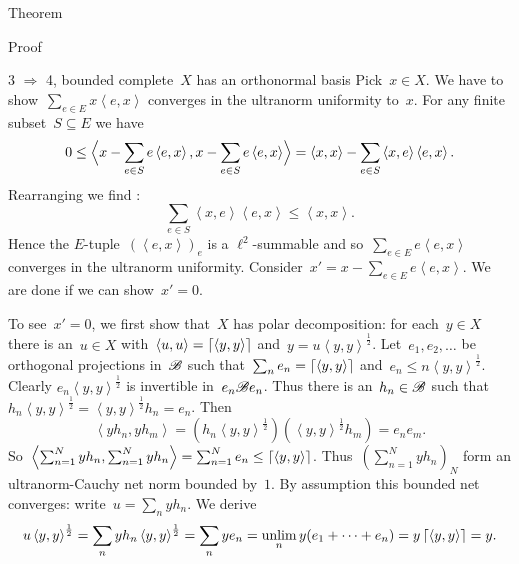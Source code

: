 \documentclass[b]{subfiles}
\begin{document}
\begin{parsec}
\begin{point}{Theorem}
\begin{point}{Proof}
\begin{point}{3
    $\Rightarrow$ 4, bounded complete~$X$ has an orthonormal basis}
Pick~$x \in X$.
We have to show~$\sum_{e \in E} x\left<e,x\right>$
converges in the ultranorm uniformity to~$x$.
For any finite subset~$S \subseteq E$ we have
\begin{equation*}
    0 \leq \Bigl< x - \sum_{e \in S} e\left<e,x\right>,
        x - \sum_{e \in S} e\left<e,x\right> \Bigr>
        = \left<x,x\right> - \sum_{e \in S} \left<x,e\right>\left<e,x\right>.
\end{equation*}
Rearranging we find :
\begin{equation*}
\sum_{e \in S} \left<x,e\right>\left<e,x\right>
    \leq \left<x,x\right>.
\end{equation*}
Hence the $E$-tuple~$(\left<e,x\right>)_e$
is a $\ell^2$-summable
and so~$\sum_{e \in E} e \left<e,x\right>$
converges in the ultranorm uniformity.
Consider~$x' = x - \sum_{e \in E} e\left<e,x\right>$.
We are done if we can show~$x' = 0$.

To see~$x'=0$, we
first show that~$X$ has polar decomposition:
    for each~$y \in X$ there is an~$u\in X$
    with~$\left<u,u\right> = \left\lceil\left<y,y\right>\right\rceil$
        and~$y=u\left<y,y\right>^{\frac{1}{2}}$.
Let~$e_1, e_2, \ldots$ be orthogonal projections in~$\mathscr{B}$ 
    such that~$\sum_n e_n = \left\lceil\left<y,y\right>\right\rceil$
    and~$e_n \leq n\left<y,y\right>^{\frac{1}{2}}$.
    Clearly $e_n \left<y,y\right>^{\frac{1}{2}}$ is invertible
        in~$e_n \mathscr{B} e_n$.
    Thus there is an~$h_n \in \mathscr{B}$
        such that $h_n \left<y,y\right>^{\frac{1}{2}} =
             \left<y,y\right>^{\frac{1}{2}} h_n = e_n$.
Then
\begin{equation*}
    \left<yh_n,yh_m\right> =
        (h_n \left<y,y\right>^{\frac{1}{2}})
        (\left<y,y\right>^{\frac{1}{2}} h_m) = e_ne_m.
\end{equation*}
So~$\left< \sum_{n=1}^N y h_n, \sum_{n=1}^N y h_n \right> 
        = \sum_{n=1}^N e_n \leq \left\lceil\left<y,y\right>\right\rceil$.
Thus~$( \sum_{n=1}^N y h_n)_N$ form an ultranorm-Cauchy net
    norm bounded by~$1$.
By assumption this bounded net converges:
    write~$u = \sum_n yh_n$.
We derive 
\begin{equation*}
u \left<y,y\right>^{\frac{1}{2}}
= \sum_n yh_n \left<y,y\right>^{\frac{1}{2}}
= \sum_n y e_n
= \unlim_n y (e_1 + \cdots + e_n)
= y \ceil{\left<y,y\right>}
= y.
\end{equation*}


\end{point}
\end{point}
\end{point}
\end{parsec}
\end{document}
